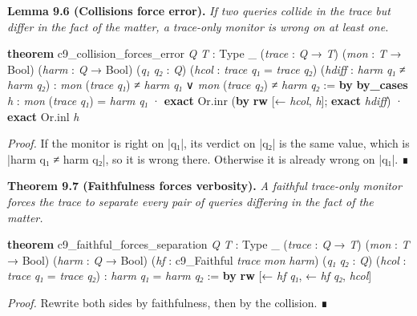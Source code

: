 \documentclass{memoir}
\begin{document}
\textbf{Lemma 9.6 (Collisions force error).} \emph{If two queries collide in the trace but differ
in the fact of the matter, a trace-only monitor is wrong on at least one.}

\begin{LeanVerbatim}
\textbf{theorem} c9_collision_forces_error \textit{Q} \textit{T} : Type _
    (\textit{trace} : \textit{Q} → \textit{T}) (\textit{mon} : \textit{T} → Bool) (\textit{harm} : \textit{Q} → Bool)
    (\textit{q₁} \textit{q₂} : \textit{Q}) (\textit{hcol} : \textit{trace} \textit{q₁} = \textit{trace} \textit{q₂})
    (\textit{hdiff} : \textit{harm} \textit{q₁} ≠ \textit{harm} \textit{q₂}) :
    \textit{mon} (\textit{trace} \textit{q₁}) ≠ \textit{harm} \textit{q₁} ∨ \textit{mon} (\textit{trace} \textit{q₂}) ≠ \textit{harm} \textit{q₂} :=
      \textbf{by}
  \textbf{by_cases} \textit{h} : \textit{mon} (\textit{trace} \textit{q₁}) = \textit{harm} \textit{q₁}
  · \textbf{exact} Or.inr (\textbf{by} \textbf{rw} [← \textit{hcol}, \textit{h}]; \textbf{exact} \textit{hdiff})
  · \textbf{exact} Or.inl \textit{h}

\end{LeanVerbatim}


\emph{Proof.} If the monitor is right on \LeanVerb|q₁|, its verdict on \LeanVerb|q₂| is the same value, which
is \LeanVerb|harm q₁ ≠ harm q₂|, so it is wrong there. Otherwise it is already wrong on
\LeanVerb|q₁|. ∎

\textbf{Theorem 9.7 (Faithfulness forces verbosity).} \emph{A faithful trace-only monitor forces
the trace to separate every pair of queries differing in the fact of the
matter.}

\begin{LeanVerbatim}
\textbf{theorem} c9_faithful_forces_separation \textit{Q} \textit{T} : Type _
    (\textit{trace} : \textit{Q} → \textit{T}) (\textit{mon} : \textit{T} → Bool) (\textit{harm} : \textit{Q} → Bool)
    (\textit{hf} : c9_Faithful \textit{trace} \textit{mon} \textit{harm})
    (\textit{q₁} \textit{q₂} : \textit{Q}) (\textit{hcol} : \textit{trace} \textit{q₁} = \textit{trace} \textit{q₂}) :
    \textit{harm} \textit{q₁} = \textit{harm} \textit{q₂} := \textbf{by}
  \textbf{rw} [← \textit{hf} \textit{q₁}, ← \textit{hf} \textit{q₂}, \textit{hcol}]

\end{LeanVerbatim}


\emph{Proof.} Rewrite both sides by faithfulness, then by the collision. ∎
\end{document}
